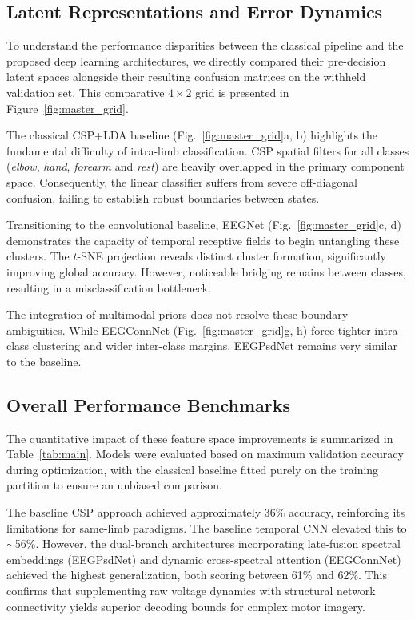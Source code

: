 \subsection{Latent Representations and Error Dynamics}
\label{sec:latent_confusion}
To understand the performance disparities between the classical pipeline and the proposed deep learning architectures, we directly compared their pre-decision latent spaces alongside their resulting confusion matrices on the withheld validation set. This comparative $4 \times 2$ grid is presented in Figure~\ref{fig:master_grid}.

The classical CSP+LDA baseline (Fig.~\ref{fig:master_grid}a, b) highlights the fundamental difficulty of intra-limb classification. CSP spatial filters for all classes (\emph{elbow}, \emph{hand}, \emph{forearm} and \emph{rest}) are heavily overlapped in the primary component space. Consequently, the linear classifier suffers from severe off-diagonal confusion, failing to establish robust boundaries between states.

Transitioning to the convolutional baseline, EEGNet (Fig.~\ref{fig:master_grid}c, d) demonstrates the capacity of temporal receptive fields to begin untangling these clusters. The $t$-SNE projection reveals distinct cluster formation, significantly improving global accuracy. However, noticeable bridging remains between classes, resulting in a misclassification bottleneck.

The integration of multimodal priors does not resolve these boundary ambiguities. While EEGConnNet (Fig.~\ref{fig:master_grid}g, h) force tighter intra-class clustering and wider inter-class margins, EEGPsdNet remains very similar to the baseline.

\subsection{Overall Performance Benchmarks}
\label{sec:accuracy}
The quantitative impact of these feature space improvements is summarized in Table~\ref{tab:main}. Models were evaluated based on maximum validation accuracy during optimization, with the classical baseline fitted purely on the training partition to ensure an unbiased comparison. 

The baseline CSP approach achieved approximately 36\% accuracy, reinforcing its limitations for same-limb paradigms. The baseline temporal CNN elevated this to $\sim$56\%. However, the dual-branch architectures incorporating late-fusion spectral embeddings (EEGPsdNet) and dynamic cross-spectral attention (EEGConnNet) achieved the highest generalization, both scoring between 61\% and 62\%. This confirms that supplementing raw voltage dynamics with structural network connectivity yields superior decoding bounds for complex motor imagery.

